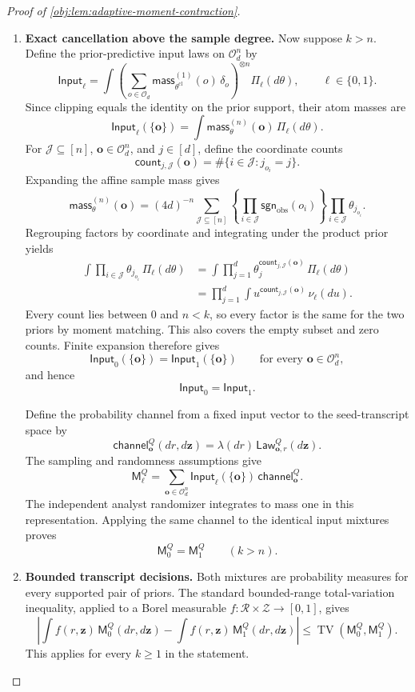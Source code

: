 \documentclass[11pt]{article}
\begin{document}
\begin{proof}[Proof of \cref{obj:lem:adaptive-moment-contraction}]
\begin{enumerate}
\item \textbf{Exact cancellation above the sample degree.}
Now suppose \(k>n\). Define the prior-predictive input laws on
\(\mathcal O_d^n\) by
\[
\mathsf{Input}_\ell
=
\int
 \left(\sum_{o\in\mathcal O_d}
  \mathsf{mass}^{(1)}_{\theta^{\mathrm{cl}}}(o)\,\delta_o
 \right)^{\otimes n}
 \Pi_\ell(d\theta),
\qquad \ell\in\{0,1\}.
\]
Since clipping equals the identity on the prior support, their atom masses are
\[
\mathsf{Input}_\ell(\{\mathbf o\})
=\int\mathsf{mass}^{(n)}_\theta(\mathbf o)\,\Pi_\ell(d\theta).
\]
For \(\mathcal J\subseteq[n]\), \(\mathbf o\in\mathcal O_d^n\), and \(j\in[d]\), define the coordinate counts
\[
\mathsf{count}_{j,\mathcal J}(\mathbf o)
=\#\{i\in\mathcal J:j_{o_i}=j\}.
\]
Expanding the affine sample mass gives
\[
\mathsf{mass}^{(n)}_\theta(\mathbf o)
=
(4d)^{-n}
\sum_{\mathcal J\subseteq[n]}
 \left\{\prod_{i\in\mathcal J}\mathsf{sgn}_{\mathrm{obs}}(o_i)\right\}
 \prod_{i\in\mathcal J}\theta_{j_{o_i}}.
\]
Regrouping factors by coordinate and integrating under the product prior yields
\[
\begin{split}
\int\prod_{i\in\mathcal J}\theta_{j_{o_i}}\,\Pi_\ell(d\theta)
&=
\int\prod_{j=1}^d
 \theta_j^{\mathsf{count}_{j,\mathcal J}(\mathbf o)}
 \,\Pi_\ell(d\theta)\\
&=
\prod_{j=1}^d
 \int u^{\mathsf{count}_{j,\mathcal J}(\mathbf o)}\,\nu_\ell(du).
\end{split}
\]
Every count lies between \(0\) and \(n<k\), so every factor is the same for the two priors by moment matching. This also covers the empty subset and zero counts. Finite expansion therefore gives
\[
\mathsf{Input}_0(\{\mathbf o\})
=\mathsf{Input}_1(\{\mathbf o\})
\qquad
\text{for every \(\mathbf o\in\mathcal O_d^n\)},
\]
and hence
\[
\mathsf{Input}_0=\mathsf{Input}_1.
\]

Define the probability channel from a fixed input vector to the seed-transcript space by
\[
\mathsf{channel}^Q_{\mathbf o}(dr,d\mathbf z)
=\lambda(dr)\,\mathsf{Law}^Q_{\mathbf o,r}(d\mathbf z).
\]
The sampling and randomness assumptions give
\[
\mathsf M_\ell^Q
=
\sum_{\mathbf o\in\mathcal O_d^n}
 \mathsf{Input}_\ell(\{\mathbf o\})\,
 \mathsf{channel}^Q_{\mathbf o}.
\]
The independent analyst randomizer integrates to mass one in this representation. Applying the same channel to the identical input mixtures proves
\[
\mathsf M_0^Q=\mathsf M_1^Q
\qquad(k>n).
\]

\item \textbf{Bounded transcript decisions.}
Both mixtures are probability measures for every supported pair of priors. The standard bounded-range total-variation inequality, applied to a Borel measurable
\(f:\mathcal R\times\mathcal Z\to[0,1]\), gives
\[
\left|
\int f(r,\mathbf z)\,\mathsf M_0^Q(dr,d\mathbf z)
-
\int f(r,\mathbf z)\,\mathsf M_1^Q(dr,d\mathbf z)
\right|
\le
\operatorname{TV}(\mathsf M_0^Q,\mathsf M_1^Q).
\]
This applies for every \(k\ge1\) in the statement.
\end{enumerate}
\end{proof}
\end{document}
